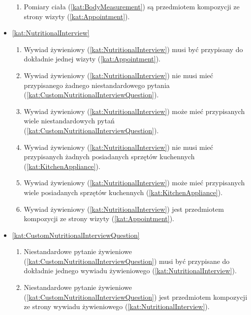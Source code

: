 \begin{itemize}[label={\textbf{Reguły dla}}, wide, labelwidth=!, labelindent=0pt]
\begin{enumerate}[label={\textbf{REG/5/\protect\twodigits{\arabic{enumi}}}}, wide, labelwidth=!, align=left, leftmargin=3cm, resume]
        \item Pomiary ciała (\ref{kat:BodyMeasurement}) są przedmiotem kompozycji ze strony wizyty (\ref{kat:Appointment}).
    \end{enumerate}
    \item\ref{kat:NutritionalInterview}\mynobreakpar
    \begin{enumerate}[label={\textbf{REG/5/\protect\twodigits{\arabic{enumi}}}}, wide, labelwidth=!, align=left, leftmargin=3cm, resume]
        \item Wywiad żywieniowy (\ref{kat:NutritionalInterview}) musi być przypisany do dokładnie jednej wizyty (\ref{kat:Appointment}).
        \item Wywiad żywieniowy (\ref{kat:NutritionalInterview}) nie musi mieć przypisanego żadnego niestandardowego pytania (\ref{kat:CustomNutritionalInterviewQuestion}).
        \item Wywiad żywieniowy (\ref{kat:NutritionalInterview}) może mieć przypisanych wiele niestandardowych pytań (\ref{kat:CustomNutritionalInterviewQuestion}).
        \item Wywiad żywieniowy (\ref{kat:NutritionalInterview}) nie musi mieć przypisanych żadnych posiadanych sprzętów kuchennych (\ref{kat:KitchenAppliance}).
        \item Wywiad żywieniowy (\ref{kat:NutritionalInterview}) może mieć przypisanych wiele posiadanych sprzętów kuchennych (\ref{kat:KitchenAppliance}).
        \item Wywiad żywieniowy (\ref{kat:NutritionalInterview}) jest przedmiotem kompozycji ze strony wizyty (\ref{kat:Appointment}).
    \end{enumerate}
    \item\ref{kat:CustomNutritionalInterviewQuestion}\mynobreakpar
    \begin{enumerate}[label={\textbf{REG/5/\protect\twodigits{\arabic{enumi}}}}, wide, labelwidth=!, align=left, leftmargin=3cm, resume]
        \item Niestandardowe pytanie żywieniowe (\ref{kat:CustomNutritionalInterviewQuestion}) musi być przypisane do dokładnie jednego wywiadu żywieniowego (\ref{kat:NutritionalInterview}).
        \item Niestandardowe pytanie żywieniowe (\ref{kat:CustomNutritionalInterviewQuestion}) jest przedmiotem kompozycji ze strony wywiadu żywieniowego (\ref{kat:NutritionalInterview}).
    \end{enumerate}

\end{itemize}
